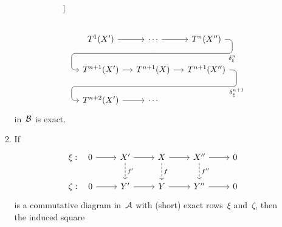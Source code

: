 \begin{definition}
\begin{enumerate}
\begin{enumerate}[label=(C$\delta$\arabic*)]
\[\begin{tikzcd}[column sep = small]
                      ]
              \\
                {}
              & T^1(X')
                \arrow{r}
              & \dotsb
                \arrow{r}
                \arrow[d, phantom, ""{coordinate, name=Z2}]
              & T^n(X'')
                \arrow[ dll,
                        "\delta_\xi^n",
                        rounded corners,
                        to path={ -- ([xshift=2ex]\tikztostart.east)
                                  |- (Z2) \tikztonodes
                                  -| ([xshift=-2ex]\tikztotarget.west)
                                  -- (\tikztotarget)}
                      ]
              \\
                {}
              & T^{n+1}(X')
                \arrow{r}
              & T^{n+1}(X)
                \arrow{r}
                \arrow[d, phantom, ""{coordinate, name=Z3}]
              & T^{n+1}(X'')
                \arrow[ dll,
                        "\delta_\xi^{n+1}",
                        rounded corners,
                        to path={ -- ([xshift=2ex]\tikztostart.east)
                                  |- (Z3) \tikztonodes
                                  -| ([xshift=-2ex]\tikztotarget.west)
                                  -- (\tikztotarget)}
                      ]
              \\
                {}
              & T^{n+2}(X')
                \arrow{r}
              & \dotsb
              & {}
            \end{tikzcd}
          \]
          in~$\mathcal{B}$ is exact.
        \item
          If
          \[
            \begin{tikzcd}
                \xi:
                \quad
                0
                \arrow{r}
              & X'
                \arrow{r}
                \arrow[dashed]{d}[right]{f'}
              & X
                \arrow{r}
                \arrow[dashed]{d}[right]{f}
              & X''
                \arrow{r}
                \arrow[dashed]{d}[right]{f''}
              & 0
              \\
                \zeta:
                \quad
                0
                \arrow{r}
              & Y'
                \arrow{r}
              & Y
                \arrow{r}
              & Y''
                \arrow{r}
              & 0
            \end{tikzcd}
          \]
          is a commutative diagram in~$\mathcal{A}$ with (short) exact rows~$\xi$ and~$\zeta$, then the induced square

\end{enumerate}
\end{enumerate}
\end{definition}
